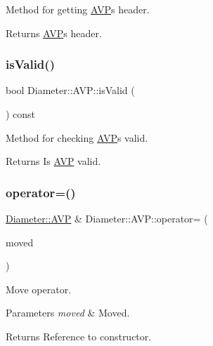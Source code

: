 Method for getting \hyperlink{classDiameter_1_1AVP}{A\+VP}\textquotesingle{}s header. 

\begin{DoxyReturn}{Returns}
\hyperlink{classDiameter_1_1AVP}{A\+VP}\textquotesingle{}s header. 
\end{DoxyReturn}
\mbox{\label{classDiameter_1_1AVP_a62d6c475e55729eb6fb15e442bc9bd65}} 
\subsubsection{\texorpdfstring{is\+Valid()}{isValid()}}
{\footnotesize\ttfamily bool Diameter\+::\+A\+V\+P\+::is\+Valid (\begin{DoxyParamCaption}{ }\end{DoxyParamCaption}) const}



Method for checking \hyperlink{classDiameter_1_1AVP}{A\+VP}\textquotesingle{}s valid. 

\begin{DoxyReturn}{Returns}
Is \hyperlink{classDiameter_1_1AVP}{A\+VP} valid. 
\end{DoxyReturn}
\mbox{\label{classDiameter_1_1AVP_a8b3cb410b287be025497c50f0a2f95d6}} 
\subsubsection{\texorpdfstring{operator=()}{operator=()}\hspace{0.1cm}{\footnotesize\ttfamily [1/2]}}
{\footnotesize\ttfamily \hyperlink{classDiameter_1_1AVP}{Diameter\+::\+A\+VP} \& Diameter\+::\+A\+V\+P\+::operator= (\begin{DoxyParamCaption}\item[{\hyperlink{classDiameter_1_1AVP}{Diameter\+::\+A\+VP} \&\&}]{moved }\end{DoxyParamCaption})\hspace{0.3cm}{\ttfamily [noexcept]}}



Move operator. 


\begin{DoxyParams}{Parameters}
{\em moved} & Moved. \\
\hline
\end{DoxyParams}
\begin{DoxyReturn}{Returns}
Reference to constructor. 
\end{DoxyReturn}
\mbox{\label{classDiameter_1_1AVP_adfe27eb6cac4704d495f3f21830abb4e}} 

